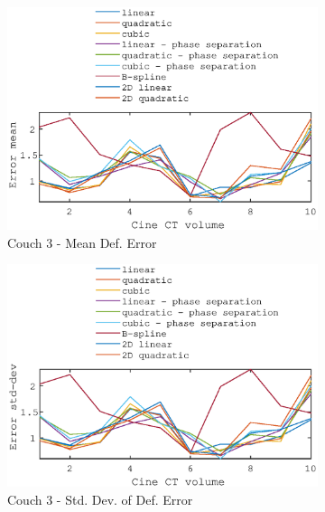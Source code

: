 \documentclass[11pt,a4paper,oneside]{report}
\begin{document}
\begin{figure}[H]
\begin{subfigure}[b]{0.5\textwidth}
    \includegraphics[width=\textwidth, trim=0 0 0 \trimval,clip=true]{figures/task4/def_mean_error_couch3.eps}
    \caption{Couch 3 - Mean Def. Error}
  \end{subfigure}%
  \begin{subfigure}[b]{0.5\textwidth}
    \includegraphics[width=\textwidth, trim=0 0 0 \trimval,clip=true]{figures/task4/def_stddev_error_couch3.eps}
    \caption{Couch 3 - Std. Dev. of Def. Error}
  \end{subfigure}
  ~
    \hspace*{-2em}
  \begin{subfigure}[b]{0.5\textwidth}

\end{subfigure}
\end{figure}
\end{document}
